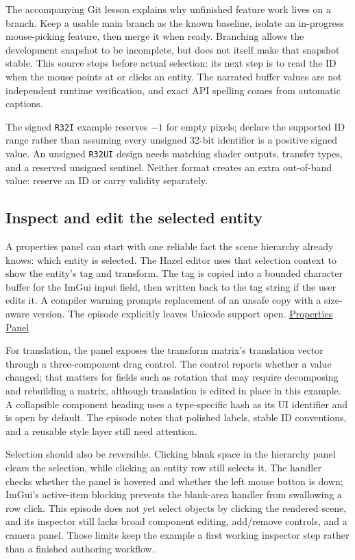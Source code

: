 The accompanying Git lesson explains why unfinished feature work lives on a branch. Keep a usable main branch as the known baseline, isolate an in-progress mouse-picking feature, then merge it when ready. Branching allows the development snapshot to be incomplete, but does not itself make that snapshot stable. This source stops before actual selection: its next step is to read the ID when the mouse points at or clicks an entity. The narrated buffer values are not independent runtime verification, and exact API spelling comes from automatic captions.

The signed \texttt{R32I} example reserves \(-1\) for empty pixels; declare the supported ID range rather than assuming every unsigned 32-bit identifier is a positive signed value. An unsigned \texttt{R32UI} design needs matching shader outputs, transfer types, and a reserved unsigned sentinel. Neither format creates an extra out-of-band value: reserve an ID or carry validity separately.

\subsection{Inspect and edit the selected entity}\label{06-engine-ii-ch031-inspect-and-edit-the-selected-entity}

A properties panel can start with one reliable fact the scene hierarchy already knows: which entity is selected. The Hazel editor uses that selection context to show the entity's tag and transform. The tag is copied into a bounded character buffer for the ImGui input field, then written back to the tag string if the user edits it. A compiler warning prompts replacement of an unsafe copy with a size-aware version. The episode explicitly leaves Unicode support open. \href{https://www.youtube.com/watch?v=NBpB0qscF3E}{Properties Panel}

For translation, the panel exposes the transform matrix's translation vector through a three-component drag control. The control reports whether a value changed; that matters for fields such as rotation that may require decomposing and rebuilding a matrix, although translation is edited in place in this example. A collapsible component heading uses a type-specific hash as its UI identifier and is open by default. The episode notes that polished labels, stable ID conventions, and a reusable style layer still need attention.

Selection should also be reversible. Clicking blank space in the hierarchy panel clears the selection, while clicking an entity row still selects it. The handler checks whether the panel is hovered and whether the left mouse button is down; ImGui's active-item blocking prevents the blank-area handler from swallowing a row click. This episode does not yet select objects by clicking the rendered scene, and its inspector still lacks broad component editing, add/remove controls, and a camera panel. Those limits keep the example a first working inspector step rather than a finished authoring workflow.

